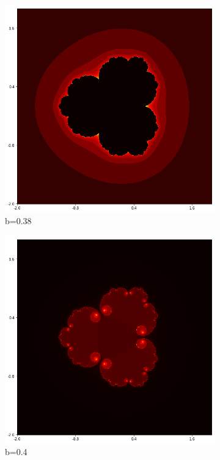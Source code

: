 \documentclass{amsart}
\theoremstyle{definition}
\theoremstyle{remark}
\numberwithin{equation}{section}
\begin{document}
 \begin{figure}[h]
 \centering
 \begin{subfigure}{.34\textwidth}
   \centering
   \includegraphics[width=.8\linewidth]{Julia33.png}
   \caption{b=0.38}
 \end{subfigure}%
 \begin{subfigure}{.34\textwidth}
   \centering
   \includegraphics[width=.8\linewidth]{Julia34.png}
   \caption{b=0.4}
 \end{subfigure}
 \begin{subfigure}{.34\textwidth}
   \centering

\end{subfigure}
\end{figure}
\end{document}
